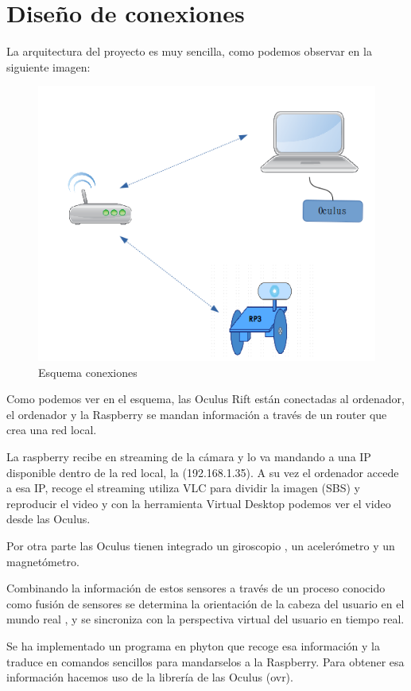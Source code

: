 \documentclass[twoside, 12pt]{epstfg}
\begin{document}
\section{Diseño de conexiones}

La arquitectura del proyecto es muy sencilla, como podemos observar en la siguiente imagen:

\begin{figure}[h]
	\centerline{
		\mbox{\includegraphics[width=.80\textwidth]{images/EsquemaConexiones.png}}
	}
	\caption{Esquema conexiones}
\end{figure}


Como podemos ver en el esquema, las Oculus Rift están conectadas al ordenador, el ordenador y la Raspberry se mandan información a través de un router que crea una red local.

La raspberry recibe en streaming de la cámara y lo va mandando a una IP disponible dentro de la red local, la (192.168.1.35). A su vez el ordenador accede a esa IP, recoge el streaming utiliza VLC para dividir la imagen (SBS) y reproducir el video y con la herramienta Virtual Desktop podemos ver el video desde las Oculus.

Por otra parte las Oculus tienen integrado un giroscopio , un acelerómetro y un magnetómetro.

Combinando la información de estos sensores a través de un proceso conocido como fusión de sensores se determina la orientación de la cabeza del usuario en el mundo real , y se sincroniza con la perspectiva virtual del usuario en tiempo real. 

Se ha implementado un programa en phyton que recoge esa información y la traduce en comandos sencillos para mandarselos a la Raspberry. Para obtener esa información hacemos uso de la librería de las Oculus (ovr).
\end{document}
